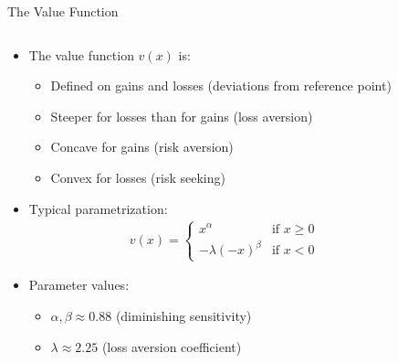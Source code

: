 \documentclass[10pt,handout]{beamer}
\begin{document}
\begin{frame}{The Value Function}
  \begin{columns}
    \begin{column}{0.55\textwidth}
      \begin{itemize}[<+->]
        \item The value function $v(x)$ is:
          \begin{itemize}
            \item Defined on gains and losses (deviations from reference point)
            \item Steeper for losses than for gains (loss aversion)
            \item Concave for gains (risk aversion)
            \item Convex for losses (risk seeking)
          \end{itemize}
        \item Typical parametrization:
          \begin{align*}
            v(x) = 
            \begin{cases}
              x^{\alpha} & \text{if } x \geq 0 \\
              -\lambda(-x)^{\beta} & \text{if } x < 0
            \end{cases}
          \end{align*}
        \item Parameter values:
          \begin{itemize}
            \item $\alpha, \beta \approx 0.88$ (diminishing sensitivity)
            \item $\lambda \approx 2.25$ (loss aversion coefficient)
          \end{itemize}
      \end{itemize}
    \end{column}
    \begin{column}{0.45\textwidth}
      \onslide<+->
\end{column}
\end{columns}
\end{frame}
\end{document}
